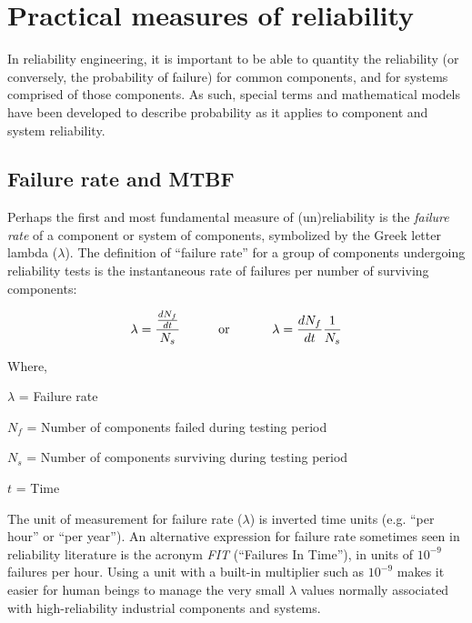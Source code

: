 \filbreak
\section{Practical measures of reliability}

In reliability engineering, it is important to be able to quantity the reliability (or conversely, the probability of failure) for common components, and for systems comprised of those components.  As such, special terms and mathematical models have been developed to describe probability as it applies to component and system reliability.






\filbreak
\subsection{Failure rate and MTBF}

Perhaps the first and most fundamental measure of (un)reliability is the \textit{failure rate} of a component or system of components, symbolized by the Greek letter lambda ($\lambda$).  The definition of ``failure rate'' for a group of components undergoing reliability tests is the instantaneous rate of failures per number of surviving components:   

$$\lambda = {{dN_f \over dt} \over N_s} \hbox{\hskip 30pt or \hskip 30pt} \lambda = {{dN_f \over dt} {1 \over N_s}}$$

\noindent
Where,

$\lambda$ = Failure rate

$N_f$ = Number of components failed during testing period

$N_s$ = Number of components surviving during testing period

$t$ = Time

\vskip 10pt

The unit of measurement for failure rate ($\lambda$) is inverted time units (e.g. ``per hour'' or ``per year'').  An alternative expression for failure rate sometimes seen in reliability literature is the acronym \textit{FIT} (``Failures In Time''), in units of $10^{-9}$ failures per hour.  Using a unit with a built-in multiplier such as $10^{-9}$ makes it easier for human beings to manage the very small $\lambda$ values normally associated with high-reliability industrial components and systems.    

